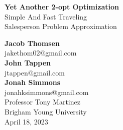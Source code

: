 \documentclass{article}
\begin{document}
\begin{titlepage}
    \begin{center}
        \vspace*{1cm}
        \Huge
        \textbf{Yet Another 2-opt Optimization} \\

        \vspace{0.5cm}
        \large
        Simple And Fast Traveling \\
        Salesperson Problem Approximation
            
        \vspace{1.5cm}

        \textbf{Jacob Thomsen} \\
        jakethom02@gmail.com \\
        \vspace{0.5cm}
        \textbf{John Tappen} \\
        jtappen@gmail.com \\
        \vspace{0.5cm}
        \textbf{Jonah Simmons} \\
        jonahksimmons@gmail.com \\

        \vfill
        Professor Tony Martinez \\
        Brigham Young University \\
        April 18, 2023
    \end{center}
\end{titlepage}
\end{document}
